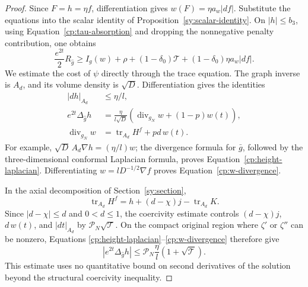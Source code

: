 \begin{proof}
Since $F=h=\eta f$, differentiation gives
$w(F)=\eta a_w|df|$.  Substitute the equations into the scalar identity
of Proposition~\ref{sy:scalar-identity}.  On $|h|\le b_3$, using
Equation~\eqref{cp:tau-absorption} and dropping the nonnegative penalty
contribution, one obtains
\begin{equation}\label{cp:unmodified-curvature}
 \frac{e^{2t}}2R_{\widehat g}
 \ge I_g(w)+\rho+(1-\delta_0)\mathcal T
                 +(1-\delta_0)\eta a_w|df|.
\end{equation}
We estimate the cost of $\psi$ directly through the trace equation.
The graph inverse is $A_d$, and its volume density is $\sqrt D$.
Differentiation gives the identities
\begin{align}
 |dh|_{A_d}&\le\eta/l,\label{cp:height-gradient}\\
 e^{2t}\Delta_{\widehat g}h
 &=\frac{\eta}{l\sqrt D}
       \left(\operatorname{div}_{g_N}w+(1-p)w(t)\right),
       \label{cp:height-laplacian}\\
 \operatorname{div}_{g_N}w
 &=\operatorname{tr}_{A_d}H^f+p d\,w(t).
       \label{cp:w-divergence}
\end{align}
For example, $\sqrt D\,A_d\nabla h=(\eta/l)w$; the divergence
formula for $\bar g$, followed by the three-dimensional conformal
Laplacian formula, proves Equation~\eqref{cp:height-laplacian}.
Differentiating $w=lD^{-1/2}\nabla f$ proves
Equation~\eqref{cp:w-divergence}.

In the axial decomposition of Section~\ref{sy:section},
\[
 \operatorname{tr}_{A_d}H^f
     =h+(d-\chi)j-\operatorname{tr}_{A_d}K.
\]
Since $|d-\chi|\le d$ and $0<d\le1$, the coercivity estimate controls
$(d-\chi)j$, $d\,w(t)$, and $|dt|_{A_d}$ by
$\mathcal P_N\sqrt{\mathcal T}$.  On the compact original region
where $\zeta'$ or $\zeta''$ can be nonzero, Equations
\eqref{cp:height-laplacian}--\eqref{cp:w-divergence} therefore give
\begin{equation}\label{cp:height-laplacian-bound}
 \left|e^{2t}\Delta_{\widehat g}h\right|
 \le\mathcal P_N\frac\eta l(1+\sqrt{\mathcal T}).
\end{equation}
This estimate uses no quantitative bound on second derivatives of
the solution beyond the structural coercivity inequality.


\end{proof}
